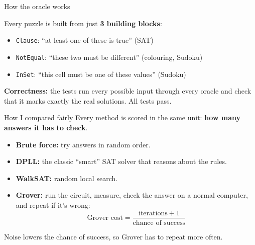 \documentclass[aspectratio=169,11pt]{beamer}
\begin{document}
\begin{frame}{How the oracle works}
\begin{center}
\end{center}
\vspace{0.6em}
Every puzzle is built from just \textbf{3 building blocks}:
\begin{itemize}
\item \texttt{Clause}: ``at least one of these is true'' (SAT)
\item \texttt{NotEqual}: ``these two must be different'' (colouring, Sudoku)
\item \texttt{InSet}: ``this cell must be one of these values'' (Sudoku)
\end{itemize}
\textbf{Correctness:} the tests run every possible input through every oracle and check that it marks exactly the real solutions. All tests pass.
\end{frame}

\begin{frame}{How I compared fairly}
Every method is scored in the same unit: \textbf{how many answers it has to check}.
\vspace{0.5em}
\begin{itemize}
\item \textbf{Brute force:} try answers in random order.
\item \textbf{DPLL:} the classic ``smart'' SAT solver that reasons about the rules.
\item \textbf{WalkSAT:} random local search.
\item \textbf{Grover:} run the circuit, measure, check the answer on a normal computer, and repeat if it's wrong:
\[
\text{Grover cost} = \frac{\text{iterations}+1}{\text{chance of success}}
\]
\end{itemize}
Noise lowers the chance of success, so Grover has to repeat more often.
\end{frame}
\end{document}
